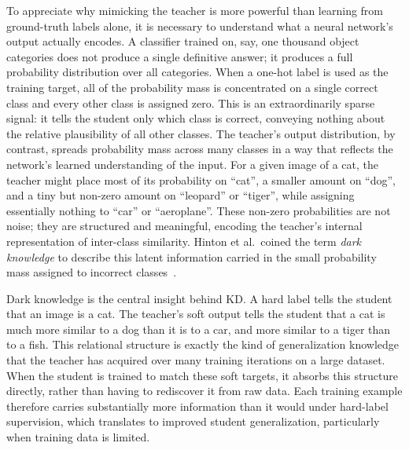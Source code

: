 \begin{foldable}
  To appreciate why mimicking the teacher is more powerful than learning from ground-truth labels alone, it is necessary to understand what a neural network's output actually encodes.
  A classifier trained on, say, one thousand object categories does not produce a single definitive answer; it produces a full probability distribution over all categories.
  When a one-hot label is used as the training target, all of the probability mass is concentrated on a single correct class and every other class is assigned zero.
  This is an extraordinarily sparse signal: it tells the student only which class is correct, conveying nothing about the relative plausibility of all other classes.
  The teacher's output distribution, by contrast, spreads probability mass across many classes in a way that reflects the network's learned understanding of the input.
  For a given image of a cat, the teacher might place most of its probability on ``cat'', a smaller amount on ``dog'', and a tiny but non-zero amount on ``leopard'' or ``tiger'', while assigning essentially nothing to ``car'' or ``aeroplane''.
  These non-zero probabilities are not noise; they are structured and meaningful, encoding the teacher's internal representation of inter-class similarity.
  Hinton et al.\ coined the term \emph{dark knowledge} to describe this latent information carried in the small probability mass assigned to incorrect classes~\cite{hinton2015distilling}.
\end{foldable}

\begin{foldable}
  Dark knowledge is the central insight behind \ac{KD}.
  A hard label tells the student that an image is a cat.
  The teacher's soft output tells the student that a cat is much more similar to a dog than it is to a car, and more similar to a tiger than to a fish.
  This relational structure is exactly the kind of generalization knowledge that the teacher has acquired over many training iterations on a large dataset.
  When the student is trained to match these soft targets, it absorbs this structure directly, rather than having to rediscover it from raw data.
  Each training example therefore carries substantially more information than it would under hard-label supervision, which translates to improved student generalization, particularly when training data is limited.
\end{foldable}


